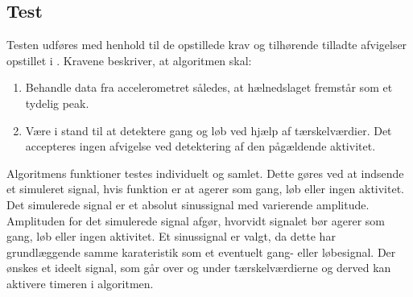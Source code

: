 \subsection{Test}
Testen udføres med henhold til de opstillede krav og tilhørende tilladte afvigelser opstillet i . Kravene beskriver, at algoritmen skal:
\begin{enumerate}
	\item Behandle data fra accelerometret således, at hælnedslaget fremstår som et tydelig peak.
	\item Være i stand til at detektere gang og løb ved hjælp af tærskelværdier. Det accepteres ingen afvigelse ved detektering af den pågældende aktivitet.
\end{enumerate}
Algoritmens funktioner testes individuelt og samlet. Dette gøres ved at indsende et simuleret signal, hvis funktion er at agerer som gang, løb eller ingen aktivitet. Det simulerede signal er et absolut sinussignal med varierende amplitude. Amplituden for det simulerede signal afgør, hvorvidt signalet bør agerer som gang, løb eller ingen aktivitet. Et sinussignal er valgt, da dette har grundlæggende samme karateristik som et eventuelt gang- eller løbesignal. Der ønskes et ideelt signal, som går over og under tærskelværdierne og derved kan aktivere timeren i algoritmen.

